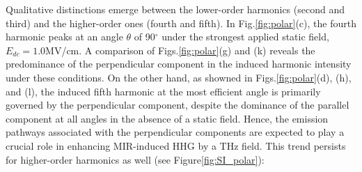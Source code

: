 Qualitative distinctions emerge between the lower-order harmonics (second and third) and the
higher-order ones (fourth and fifth). In Fig.\ref{fig:polar}(c), the fourth harmonic  peaks at
an angle $\theta$ of 90$^{\circ}$ under the strongest applied static field, $E_{dc}=1.0$MV/cm. A
comparison of Figs.\ref{fig:polar}(g) and (k) reveals the predominance of the perpendicular
component in the induced harmonic intensity under these conditions. On the other hand, as showned in
Figs.\ref{fig:polar}(d), (h), and (l), the induced fifth harmonic at the most efficient angle is
primarily governed by the perpendicular component, despite the dominance of the parallel component
at all angles in the absence of a static field. Hence, the emission pathways associated with the
perpendicular components are expected to play a crucial role in enhancing MIR-induced HHG by a
THz field. This trend persists for higher-order harmonics as well (see Figure\ref{fig:SI_polar}):
